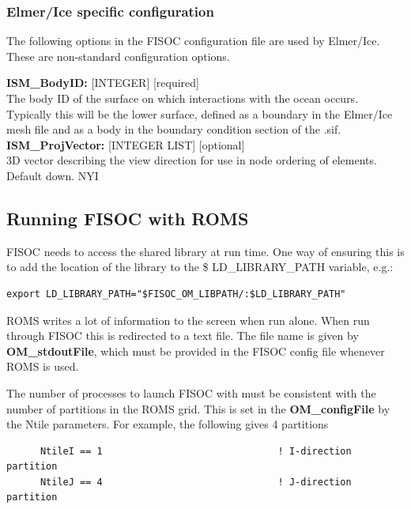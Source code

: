 \documentclass[12pt]{article}
\begin{document}
\subsubsection{Elmer/Ice specific configuration}

The following options in the FISOC configuration file are used by Elmer/Ice.  These 
are non-standard configuration options.

\begin{flushleft}
\textbf{ISM\_BodyID:} [INTEGER] [required]                               \\
The body ID of the surface on which interactions with the ocean occurs.  
Typically this will be the lower surface, defined as a boundary in the   
Elmer/Ice mesh file and as a body in the boundary condition section of   
the .sif.                                                                \\
\vspace{6pt}
\textbf{ISM\_ProjVector:} [INTEGER LIST] [optional]                      \\
3D vector describing the view direction for use in node ordering of      
elements.  Default down.  NYI                                            \\
\vspace{6pt}
\end{flushleft}





\subsection{Running FISOC with ROMS}
\label{sec:runningROMS}

FISOC needs to access the shared library at run time.  One way of ensuring this 
is to add the location of the library to the \$ LD\_LIBRARY\_PATH variable, e.g.:
\begin{lstlisting}
export LD_LIBRARY_PATH="$FISOC_OM_LIBPATH/:$LD_LIBRARY_PATH"
\end{lstlisting}

ROMS writes a lot of information to the screen when run alone.  
When run through FISOC this is redirected to a text file. 
The file name is given by \textbf{OM\_stdoutFile}, 
which must be provided in the FISOC config file 
whenever ROMS is used.

The number of processes to launch FISOC with must be consistent with the number of 
partitions in the ROMS grid.  This is set in the \textbf{OM\_configFile} by the 
Ntile parameters.  For example, the following gives 4 partitions
\begin{lstlisting}
      NtileI == 1                               ! I-direction partition
      NtileJ == 4                               ! J-direction partition
\end{lstlisting}
\end{document}
